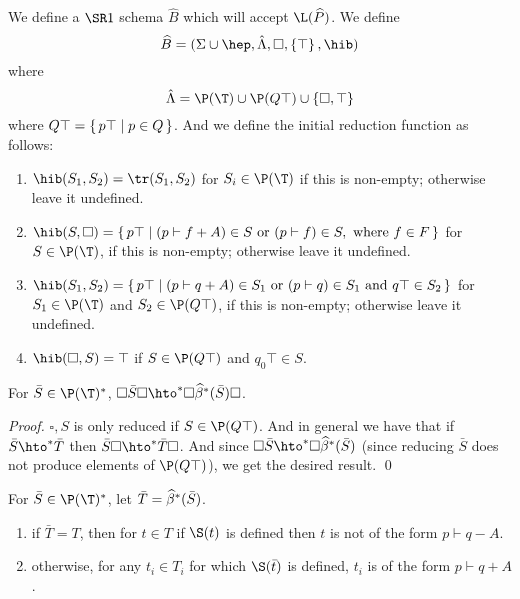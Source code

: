 \documentclass{llncs}
\begin{document}
We define a $\SR1$ schema $\widehat B$ which will accept $\L(\widehat P)$.
We define
$$ \widehat B = (\Sigma\cup\hep, \hat\Lambda, \square, \set\top, \hib) $$
where
$$ \hat\Lambda = \P(\T) \cup \P(Q\top) \cup \set{\square,\top} $$
where $Q\top=\set{p\top}[p\in Q]$.
And we define the initial reduction function as follows:
\begin{enumerate}
    \item $\hib(S_1,S_2)=\tr(S_1,S_2)$ for $S_i\in\P(\T)$ if this is non-empty; otherwise leave it undefined.
    \item $\hib(S,\square)=\set{p\top}[(p\vdash f+ A)\in S\hbox{ or }(p\vdash f)\in S,\hbox{ where $f\in F$}]$ for $S\in\P(\T)$, if this is non-empty; otherwise leave it undefined.
    \item $\hib(S_1,S_2)=\set{p\top}[(p\vdash q+ A)\in S_1\hbox{ or }(p\vdash q)\in S_1\hbox{ and }q\top\in S_2]$ for $S_1\in\P(\T)$ and $S_2\in\P(Q\top)$, if this is non-empty; otherwise leave it undefined.
    \item $\hib(\square,S)=\top$ if $S\in\P(Q\top)$ and $q_0\top\in S$.
\end{enumerate}

\begin{lemma}

    For $\bar S\in\P(\T)^*$, $\square\bar S\square\hto^*\square\hb^*(\bar S)\square$.

\end{lemma}

\begin{proof}

    $\square,S$ is only reduced if $S\in\P(Q\top)$.
    And in general we have that if $\bar S\hto^*\bar T$ then $\bar S\square\hto^*\bar T\square$.
    And since $\square\bar S\hto^*\square\hb^*(\bar S)$ (since reducing $\bar S$ does not produce elements of $\P(Q\top)$), we get the desired result.
    \qed

\end{proof}

\begin{lemma}

    For $\bar S\in\P(\T)^*$, let $\bar T=\widehat\beta^*(\bar S)$.
    \begin{enumerate}
        \item if $\bar T=T$, then for $t\in T$ if $\S(t)$ is defined then $t$ is not of the form $p\vdash q- A$.
        \item otherwise, for any $t_i\in T_i$ for which $\S(\bar t)$ is defined, $t_i$ is of the form $p\vdash q+ A$.
    \end{enumerate}

\end{lemma}
\end{document}
